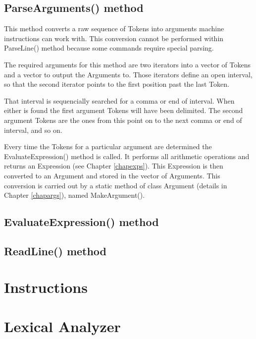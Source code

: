 \documentclass[a4paper,draft,12pt]{book}
\begin{document}
\section{ParseArguments() method}
This method converts a raw sequence of Tokens into arguments machine
instructions can work with. This conversion cannot be performed within
ParseLine() method because some commands require special parsing.

The required arguments for this method are two iterators into a vector
of Tokens and a vector to output the Arguments to. Those iterators
define an open interval, so that the second iterator points to the
first position past the last Token.

That interval is sequencially searched for a comma or end of interval.
When either is found the first argument Tokens will have been delimited.
The second argument Tokens are the ones from this point on to the next
comma or end of interval, and so on.

Every time the Tokens for a particular argument are determined the
EvaluateExpression() method is called. It performs all arithmetic
operations and returns an Expression (see Chapter \ref{chapexps}).
This Expression is then converted to an Argument and stored in the
vector of Arguments. This conversion is carried out by a static
method of class Argument (details in Chapter \ref{chapargs}),
named MakeArgument().

\section{EvaluateExpression() method}


\section{ReadLine() method}





\chapter{Instructions\label{chapinst}}







\chapter{Lexical Analyzer\label{chaplex}}
\end{document}
